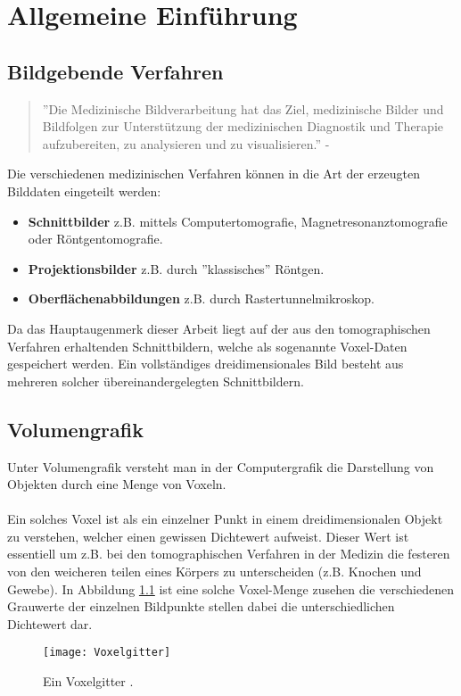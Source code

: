 \chapter{Allgemeine Einführung}

\section{Bildgebende Verfahren}
\begin{quote}
	''Die Medizinische Bildverarbeitung hat das Ziel, medizinische Bilder und Bildfolgen zur Unterstützung der medizinischen Diagnostik und Therapie aufzubereiten, zu analysieren und zu visualisieren.'' - \cite{MedBildVerarbeitung}
\end{quote}
Die verschiedenen medizinischen Verfahren können in die Art der erzeugten Bilddaten eingeteilt werden:
\begin{itemize}
	\item \textbf{Schnittbilder} z.B. mittels Computertomografie, Magnetresonanztomografie oder Röntgentomografie.
	\item \textbf{Projektionsbilder} z.B. durch ''klassisches'' Röntgen.
	\item \textbf{Oberflächenabbildungen} z.B. durch Rastertunnelmikroskop.
\end{itemize}
Da das Hauptaugenmerk dieser Arbeit liegt auf der aus den tomographischen Verfahren erhaltenden Schnittbildern, welche als sogenannte Voxel-Daten gespeichert werden. Ein vollständiges dreidimensionales Bild besteht aus mehreren solcher übereinandergelegten Schnittbildern.

\section{Volumengrafik}
Unter Volumengrafik versteht man in der Computergrafik die Darstellung von Objekten durch eine Menge von Voxeln. 
\\\\
Ein solches Voxel ist als ein einzelner Punkt in einem dreidimensionalen Objekt zu verstehen, welcher einen gewissen Dichtewert aufweist. Dieser Wert ist essentiell um z.B. bei den tomographischen Verfahren in der Medizin die festeren von den weicheren teilen eines Körpers zu unterscheiden (z.B. Knochen und Gewebe). In Abbildung \ref{fig:Voxelgitter} ist eine solche Voxel-Menge zusehen die verschiedenen Grauwerte der einzelnen Bildpunkte stellen dabei die unterschiedlichen Dichtewert dar.

\begin{figure}
	\centering
	\texttt{[image: Voxelgitter]}
	\caption{Ein Voxelgitter \cite{SeibtBak}.}
	\label{fig:Voxelgitter}
\end{figure}

